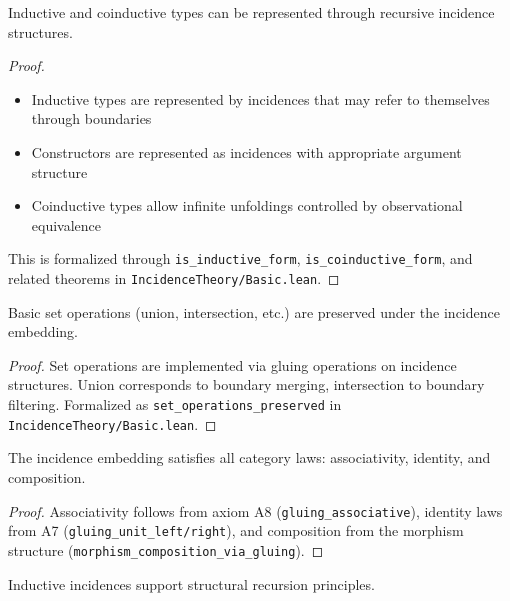 \documentclass{article}
\begin{document}
\begin{theorem}
\label{thm:type-embedding}
Inductive and coinductive types can be represented through recursive incidence structures.
\end{theorem}

\begin{proof}
\begin{itemize}
\item Inductive types are represented by incidences that may refer to themselves through boundaries
\item Constructors are represented as incidences with appropriate argument structure
\item Coinductive types allow infinite unfoldings controlled by observational equivalence
\end{itemize}

This is formalized through \texttt{is\_inductive\_form}, \texttt{is\_coinductive\_form}, and related theorems in \texttt{IncidenceTheory/Basic.lean}.
\end{proof}

\begin{theorem}
\label{thm:set-operations}
Basic set operations (union, intersection, etc.) are preserved under the incidence embedding.
\end{theorem}

\begin{proof}
Set operations are implemented via gluing operations on incidence structures. Union corresponds to boundary merging, intersection to boundary filtering. Formalized as \texttt{set\_operations\_preserved} in \texttt{IncidenceTheory/Basic.lean}.
\end{proof}

\begin{theorem}
\label{thm:category-laws}
The incidence embedding satisfies all category laws: associativity, identity, and composition.
\end{theorem}

\begin{proof}
Associativity follows from axiom A8 (\texttt{gluing\_associative}), identity laws from A7 (\texttt{gluing\_unit\_left/right}), and composition from the morphism structure (\texttt{morphism\_composition\_via\_gluing}).
\end{proof}

\begin{theorem}
\label{thm:inductive-recursion}
Inductive incidences support structural recursion principles.
\end{theorem}
\end{document}
